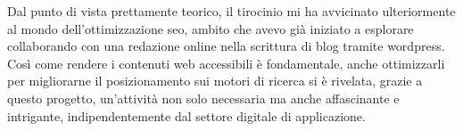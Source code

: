 \vspace{10pt}
\par\noindent Dal punto di vista prettamente teorico, il tirocinio mi ha avvicinato ulteriormente al mondo dell’ottimizzazione \gls{seo}, ambito che avevo già iniziato a esplorare collaborando con una redazione online nella scrittura di blog tramite \gls{wordpress}. Così come rendere i contenuti web accessibili è fondamentale, anche ottimizzarli per migliorarne il posizionamento sui motori di ricerca si è rivelata, grazie a questo progetto, un’attività non solo necessaria ma anche affascinante e intrigante, indipendentemente dal settore digitale di applicazione.
